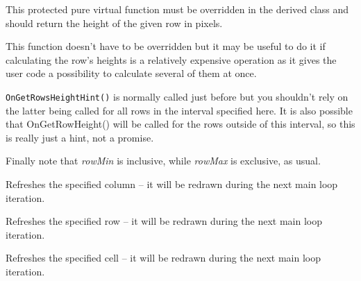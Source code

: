 \label{wxhvscrolledwindowongetrowheight}


This protected pure virtual function must be overridden in the derived class
and should return the height of the given row in pixels.




\label{wxhvscrolledwindowongetrowsheighthint}


This function doesn't have to be overridden but it may be useful to do
it if calculating the row's heights is a relatively expensive operation
as it gives the user code a possibility to calculate several of them at
once.

{\tt OnGetRowsHeightHint()} is normally called just before 
 but you
shouldn't rely on the latter being called for all rows in the interval
specified here. It is also possible that OnGetRowHeight() will be
called for the rows outside of this interval, so this is really just a
hint, not a promise.

Finally note that {\it rowMin} is inclusive, while {\it rowMax} is exclusive,
as usual.


\label{wxhvscrolledwindowrefreshcolumn}


Refreshes the specified column -- it will be redrawn during the next main loop
iteration.


\label{wxhvscrolledwindowrefreshrow}


Refreshes the specified row -- it will be redrawn during the next main loop
iteration.


\label{wxhvscrolledwindowrefreshrowcolumn}


Refreshes the specified cell -- it will be redrawn during the next main loop
iteration.


